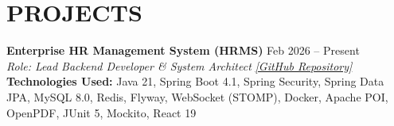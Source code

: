 ﻿\documentclass[11pt,a4paper]{article}
\begin{document}
\newpage %

\section*{PROJECTS}

\noindent
\textbf{Enterprise HR Management System (HRMS)} \hfill Feb 2026 -- Present \\
\textit{Role: Lead Backend Developer \& System Architect} \hfill \href{https://github.com/ng-doanh/hr-management-system}{\textit{[GitHub Repository]}} \\
\textbf{Technologies Used:} Java 21, Spring Boot 4.1, Spring Security, Spring Data JPA, MySQL 8.0, Redis, Flyway, WebSocket (STOMP), Docker, Apache POI, OpenPDF, JUnit 5, Mockito, React 19
\end{document}
